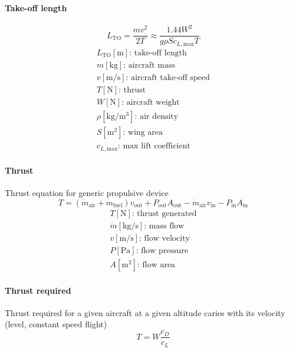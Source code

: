 \documentclass[10pt, twocolumn]{article}
\begin{document}
\paragraph{Take-off length}
\[
  L_\mathrm{TO} = \frac{m v^2}{2T} \approx \frac{1.44 W^2}{g \rho S c_{L,\mathrm{max}}T}
\]
\[
  \begin{array}{|l}
    L_\mathrm{TO} [\si{\meter}] \text{: take-off length}        \\
    m [\si{\kilogram}] \text{: aircraft mass}                   \\
    v [\si{\meter\per\second}] \text{: aircraft take-off speed} \\
    T [\si{\newton}] \text{: thrust}                            \\
    W [\si{\newton}] \text{: aircraft weight}                   \\
    \rho [\si{\kilogram\per\meter\cubed}] \text{: air density}  \\
    S [\si{\meter\squared}] \text{: wing area}                  \\
    c_{L,\mathrm{max}} \text{: max lift coefficient}
  \end{array}
\]

\paragraph{Thrust}
Thrust equation for generic propulsive device
\[
  T = (\dot{m}_\mathrm{air} + \dot{m}_\mathrm{fuel})v_\mathrm{out} + P_\mathrm{out}A_\mathrm{out} - \dot{m}_\mathrm{air}v_\mathrm{in} - P_\mathrm{in}A_\mathrm{in}
\]
\[
  \begin{array}{|l}
    T [\si{\newton}] \text{: thrust generated}             \\
    \dot{m} [\si{\kilogram\per\second}] \text{: mass flow} \\
    v [\si{\metre\per\second}] \text{: flow velocity}      \\
    P [\si{\pascal}] \text{: flow pressure}                \\
    A [\si{\metre\squared}] \text{: flow area}
  \end{array}
\]

\paragraph{Thrust required}
Thrust required for a given aircraft at a given altitude caries with its velocity (level, constant speed flight)
\[
  T = W\frac{c_D}{c_L}
\]
\end{document}
